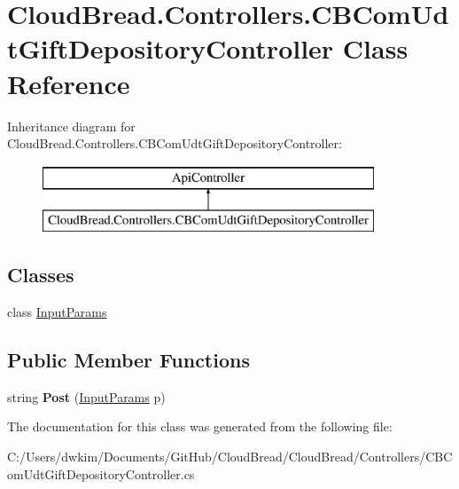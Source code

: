 \hypertarget{class_cloud_bread_1_1_controllers_1_1_c_b_com_udt_gift_depository_controller}{}\section{Cloud\+Bread.\+Controllers.\+C\+B\+Com\+Udt\+Gift\+Depository\+Controller Class Reference}
\label{class_cloud_bread_1_1_controllers_1_1_c_b_com_udt_gift_depository_controller}
Inheritance diagram for Cloud\+Bread.\+Controllers.\+C\+B\+Com\+Udt\+Gift\+Depository\+Controller\+:\begin{figure}[H]
\begin{center}
\leavevmode
\includegraphics[height=2.000000cm]{class_cloud_bread_1_1_controllers_1_1_c_b_com_udt_gift_depository_controller}
\end{center}
\end{figure}
\subsection*{Classes}
\begin{DoxyCompactItemize}
\item 
class \hyperlink{class_cloud_bread_1_1_controllers_1_1_c_b_com_udt_gift_depository_controller_1_1_input_params}{Input\+Params}
\end{DoxyCompactItemize}
\subsection*{Public Member Functions}
\begin{DoxyCompactItemize}
\item 
string {\bfseries Post} (\hyperlink{class_cloud_bread_1_1_controllers_1_1_c_b_com_udt_gift_depository_controller_1_1_input_params}{Input\+Params} p)\hypertarget{class_cloud_bread_1_1_controllers_1_1_c_b_com_udt_gift_depository_controller_a0ae6cc00b730b70f9ed6c5541f1bcc96}{}\label{class_cloud_bread_1_1_controllers_1_1_c_b_com_udt_gift_depository_controller_a0ae6cc00b730b70f9ed6c5541f1bcc96}

\end{DoxyCompactItemize}


The documentation for this class was generated from the following file\+:\begin{DoxyCompactItemize}
\item 
C\+:/\+Users/dwkim/\+Documents/\+Git\+Hub/\+Cloud\+Bread/\+Cloud\+Bread/\+Controllers/C\+B\+Com\+Udt\+Gift\+Depository\+Controller.\+cs\end{DoxyCompactItemize}
